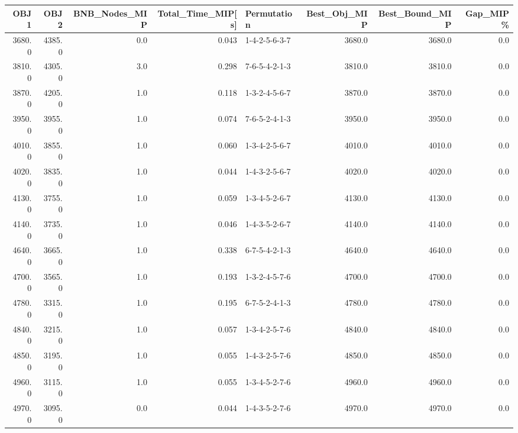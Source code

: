 \begin{tabular}{rrrrlrrr}
\toprule
   OBJ1 &    OBJ2 &  BNB\_Nodes\_MIP &  Total\_Time\_MIP[s] &    Permutation &  Best\_Obj\_MIP &  Best\_Bound\_MIP &  Gap\_MIP\% \\
\midrule
 3680.0 &  4385.0 &            0.0 &              0.043 &  1-4-2-5-6-3-7 &        3680.0 &          3680.0 &       0.0 \\
 3810.0 &  4305.0 &            3.0 &              0.298 &  7-6-5-4-2-1-3 &        3810.0 &          3810.0 &       0.0 \\
 3870.0 &  4205.0 &            1.0 &              0.118 &  1-3-2-4-5-6-7 &        3870.0 &          3870.0 &       0.0 \\
 3950.0 &  3955.0 &            1.0 &              0.074 &  7-6-5-2-4-1-3 &        3950.0 &          3950.0 &       0.0 \\
 4010.0 &  3855.0 &            1.0 &              0.060 &  1-3-4-2-5-6-7 &        4010.0 &          4010.0 &       0.0 \\
 4020.0 &  3835.0 &            1.0 &              0.044 &  1-4-3-2-5-6-7 &        4020.0 &          4020.0 &       0.0 \\
 4130.0 &  3755.0 &            1.0 &              0.059 &  1-3-4-5-2-6-7 &        4130.0 &          4130.0 &       0.0 \\
 4140.0 &  3735.0 &            1.0 &              0.046 &  1-4-3-5-2-6-7 &        4140.0 &          4140.0 &       0.0 \\
 4640.0 &  3665.0 &            1.0 &              0.338 &  6-7-5-4-2-1-3 &        4640.0 &          4640.0 &       0.0 \\
 4700.0 &  3565.0 &            1.0 &              0.193 &  1-3-2-4-5-7-6 &        4700.0 &          4700.0 &       0.0 \\
 4780.0 &  3315.0 &            1.0 &              0.195 &  6-7-5-2-4-1-3 &        4780.0 &          4780.0 &       0.0 \\
 4840.0 &  3215.0 &            1.0 &              0.057 &  1-3-4-2-5-7-6 &        4840.0 &          4840.0 &       0.0 \\
 4850.0 &  3195.0 &            1.0 &              0.055 &  1-4-3-2-5-7-6 &        4850.0 &          4850.0 &       0.0 \\
 4960.0 &  3115.0 &            1.0 &              0.055 &  1-3-4-5-2-7-6 &        4960.0 &          4960.0 &       0.0 \\
 4970.0 &  3095.0 &            0.0 &              0.044 &  1-4-3-5-2-7-6 &        4970.0 &          4970.0 &       0.0 \\
\bottomrule
\end{tabular}
